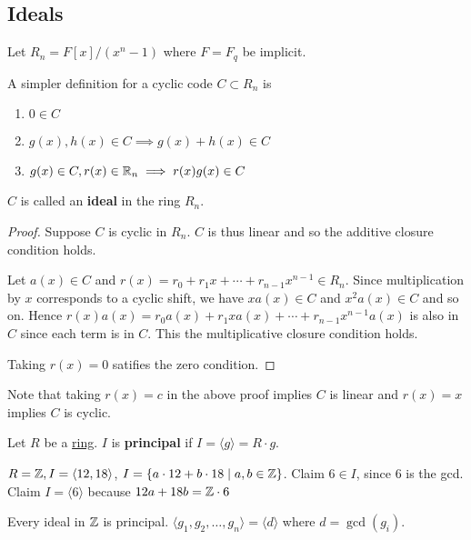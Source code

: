 \documentclass{article}
\begin{document}
\subsection{Ideals}
\begin{definition}
  Let \( R_n = F[x]/(x^n-1) \) where \( F = F_q \) be implicit.
\end{definition}
\begin{definition}\label{baz}
  A simpler definition for a cyclic code \( C \subset R_n\) is
  \begin{enumerate}
    \item \( 0 \in C \)
    \item \( g(x), h(x) \in  C \implies g(x)+h(x) \in  C \)
    \item \( g(x) \in C, r(x) \in \mathbb{R}_n \implies  r(x)g(x) \in C \)
  \end{enumerate}
  \( C \) is called an \textbf{ideal} in the ring \( R_n \).
\end{definition}
\begin{proof}
  Suppose \( C \) is cyclic in \( R_n \). \( C \) is thus linear and so the additive closure condition holds.

  Let \( a(x) \in C \) and \( r(x) = r_0 + r_1x + \cdots + r_{n-1}x^{n-1} \in R_n   \). Since multiplication by \( x  \) corresponds to a cyclic shift, we have \( xa(x) \in  C \) and \( x^2a(x) \in C \) and so on. Hence \( r(x)a(x) = r_0a(x) + r_1xa(x) + \cdots + r_{n-1}x^{n-1}a(x)  \) is also in \( C \) since each term is in \( C \). This the multiplicative closure condition holds.

  Taking \( r(x) = 0 \) satifies the zero condition.
\end{proof}
\begin{remark}
  Note that taking \( r(x) = c \) in the above proof implies \( C  \) is linear and \( r(x) = x \) implies \( C \) is cyclic.
\end{remark}
\begin{definition}
  Let \( R  \) be a \href{https://en.wikipedia.org/wiki/Ring_(mathematics)}{ring}.
  \( I \) is \textbf{principal} if \( I = \langle g \rangle = R \cdot g \).
\end{definition}
\begin{example}
  \( R = \mathbb{Z}, I = \langle 12, 18 \rangle \), \( I = \{a \cdot 12 + b
  \cdot  18 \mid a, b \in  \mathbb{Z} \} \).
  Claim \( 6 \in I \), since \( 6 \) is the gcd.
  Claim \( I = \langle 6 \rangle  \) because \( 12a + 18b = \mathbb{Z} \cdot 6 \)
\end{example}
\begin{proposition}
  Every ideal in \( \mathbb{Z} \) is principal. \( \langle g_1, g_2, \dots,
  g_n \rangle = \langle d \rangle  \) where \( d = \gcd(g_i) \).
\end{proposition}
\end{document}
